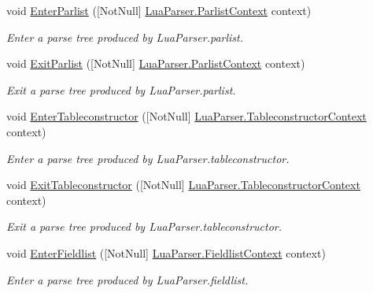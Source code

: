 \begin{DoxyCompactItemize}
void \mbox{\hyperlink{interfacezlua_1_1_i_lua_listener_a406fd2bdc9cefe77567f3012bed007e9}{Enter\+Parlist}} (\mbox{[}Not\+Null\mbox{]} \mbox{\hyperlink{classzlua_1_1_lua_parser_1_1_parlist_context}{Lua\+Parser.\+Parlist\+Context}} context)
\begin{DoxyCompactList}\small\item\em Enter a parse tree produced by Lua\+Parser.\+parlist. \end{DoxyCompactList}\item 
void \mbox{\hyperlink{interfacezlua_1_1_i_lua_listener_a067b1e085ec7ffaab84c99f820ccd5fa}{Exit\+Parlist}} (\mbox{[}Not\+Null\mbox{]} \mbox{\hyperlink{classzlua_1_1_lua_parser_1_1_parlist_context}{Lua\+Parser.\+Parlist\+Context}} context)
\begin{DoxyCompactList}\small\item\em Exit a parse tree produced by Lua\+Parser.\+parlist. \end{DoxyCompactList}\item 
void \mbox{\hyperlink{interfacezlua_1_1_i_lua_listener_a76ec51ed7a280ef9f86058371d6fbebc}{Enter\+Tableconstructor}} (\mbox{[}Not\+Null\mbox{]} \mbox{\hyperlink{classzlua_1_1_lua_parser_1_1_tableconstructor_context}{Lua\+Parser.\+Tableconstructor\+Context}} context)
\begin{DoxyCompactList}\small\item\em Enter a parse tree produced by Lua\+Parser.\+tableconstructor. \end{DoxyCompactList}\item 
void \mbox{\hyperlink{interfacezlua_1_1_i_lua_listener_ae19198d7c5130d70ca8ffa5ff81c168e}{Exit\+Tableconstructor}} (\mbox{[}Not\+Null\mbox{]} \mbox{\hyperlink{classzlua_1_1_lua_parser_1_1_tableconstructor_context}{Lua\+Parser.\+Tableconstructor\+Context}} context)
\begin{DoxyCompactList}\small\item\em Exit a parse tree produced by Lua\+Parser.\+tableconstructor. \end{DoxyCompactList}\item 
void \mbox{\hyperlink{interfacezlua_1_1_i_lua_listener_a52d5768d4a26b0d78da5e039713269cc}{Enter\+Fieldlist}} (\mbox{[}Not\+Null\mbox{]} \mbox{\hyperlink{classzlua_1_1_lua_parser_1_1_fieldlist_context}{Lua\+Parser.\+Fieldlist\+Context}} context)
\begin{DoxyCompactList}\small\item\em Enter a parse tree produced by Lua\+Parser.\+fieldlist. \end{DoxyCompactList}\item 

\end{DoxyCompactItemize}
